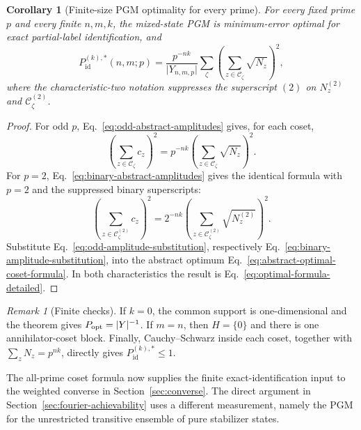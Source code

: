 \documentclass[11pt]{article}
\newcommand{\1}{\mathbf 1}
\theoremstyle{plain}
\newtheorem{corollary}[theorem]{Corollary}
\theoremstyle{definition}
\theoremstyle{remark}
\newtheorem{remark}[theorem]{Remark}
\begin{document}
\begin{corollary}[Finite-size PGM optimality for every prime]
\label{cor:abstract-theorem-all-prime-application}
For every fixed prime $p$ and every finite $n,m,k$, the mixed-state PGM is
minimum-error optimal for exact partial-label identification, and
\begin{equation}
 P_{\mathrm{id}}^{(k),*}(n,m;p)
 =\frac{p^{-nk}}{\lvert Y_{n,m,p}\rvert}\sum_{\zeta}
 \left(\sum_{z\in\mathcal C_{\zeta}}\sqrt{N_z}\right)^2,
 \label{eq:optimal-formula-detailed}
\end{equation}
where the characteristic-two notation suppresses the superscript $(2)$ on
$N_z^{(2)}$ and $\mathcal C_{\zeta}^{(2)}$.
\end{corollary}
\begin{proof}
For odd $p$, Eq.~\eqref{eq:odd-abstract-amplitudes} gives, for each coset,
\begin{equation}
 \left(\sum_{z\in\mathcal C_{\zeta}}c_z\right)^2
 =p^{-nk}\left(\sum_{z\in\mathcal C_{\zeta}}\sqrt{N_z}\right)^2.
 \label{eq:odd-amplitude-substitution}
\end{equation}
For $p=2$, Eq.~\eqref{eq:binary-abstract-amplitudes} gives the identical
formula with $p=2$ and the suppressed binary superscripts:
\begin{equation}
 \left(\sum_{z\in\mathcal C_{\zeta}^{(2)}}c_z\right)^2
 =2^{-nk}\left(\sum_{z\in\mathcal C_{\zeta}^{(2)}}
 \sqrt{N_z^{(2)}}\right)^2.
 \label{eq:binary-amplitude-substitution}
\end{equation}
Substitute Eq.~\eqref{eq:odd-amplitude-substitution}, respectively
Eq.~\eqref{eq:binary-amplitude-substitution}, into the abstract optimum
Eq.~\eqref{eq:abstract-optimal-coset-formula}.  In both characteristics the
result is Eq.~\eqref{eq:optimal-formula-detailed}.
\end{proof}

\begin{remark}[Finite checks]
\label{rem:checks}
If $k=0$, the common support is one-dimensional and the theorem gives
$P_{\rm opt}=\lvert Y\rvert^{-1}$.  If $m=n$, then $H=\{0\}$ and there is one
annihilator-coset block.  Finally, Cauchy--Schwarz inside each coset, together with
$\sum_zN_z=p^{nk}$, directly gives
$P_{\mathrm{id}}^{(k),*}\le1$.
\end{remark}

The all-prime coset formula now supplies the finite exact-identification input  
to the weighted converse in Section~\ref{sec:converse}.  The direct argument in  
Section~\ref{sec:fourier-achievability} uses a different measurement, namely the  
PGM for the unrestricted transitive ensemble of pure stabilizer states.  
\end{document}
